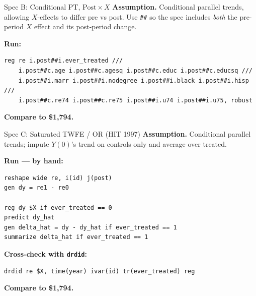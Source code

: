\documentclass[11pt,aspectratio=169]{beamer}
\begin{document}
\begin{frame}[fragile]{Spec B: Conditional PT, $\text{Post}\times X$}
\textbf{Assumption.} \;Conditional parallel trends, allowing $X$-effects to differ pre vs post. \;Use \texttt{\#\#} so the spec includes \textit{both} the pre-period $X$ effect and its post-period change.
\vspace{0.4em}

\textbf{Run:}
\begin{lstlisting}[language={[ANSI]C},basicstyle=\ttfamily\footnotesize]
reg re i.post##i.ever_treated ///
    i.post##c.age i.post##c.agesq i.post##c.educ i.post##c.educsq ///
    i.post##i.marr i.post##i.nodegree i.post##i.black i.post##i.hisp ///
    i.post##c.re74 i.post##c.re75 i.post##i.u74 i.post##i.u75, robust
\end{lstlisting}

\vspace{0.3em}
\textbf{Compare to \$1,794.} \;
\end{frame}

\begin{frame}[fragile]{Spec C: Saturated TWFE / OR (HIT 1997)}
\textbf{Assumption.} \;Conditional parallel trends; impute $Y(0)$'s trend on controls only and average over treated.
\vspace{0.4em}

\textbf{Run --- by hand:}
\begin{lstlisting}[language={[ANSI]C},basicstyle=\ttfamily\footnotesize]
reshape wide re, i(id) j(post)
gen dy = re1 - re0

reg dy $X if ever_treated == 0
predict dy_hat
gen delta_hat = dy - dy_hat if ever_treated == 1
summarize delta_hat if ever_treated == 1
\end{lstlisting}

\textbf{Cross-check with \texttt{drdid}:}
\begin{lstlisting}[language={[ANSI]C},basicstyle=\ttfamily\footnotesize]
drdid re $X, time(year) ivar(id) tr(ever_treated) reg
\end{lstlisting}

\textbf{Compare to \$1,794.} \;
\end{frame}
\end{document}
